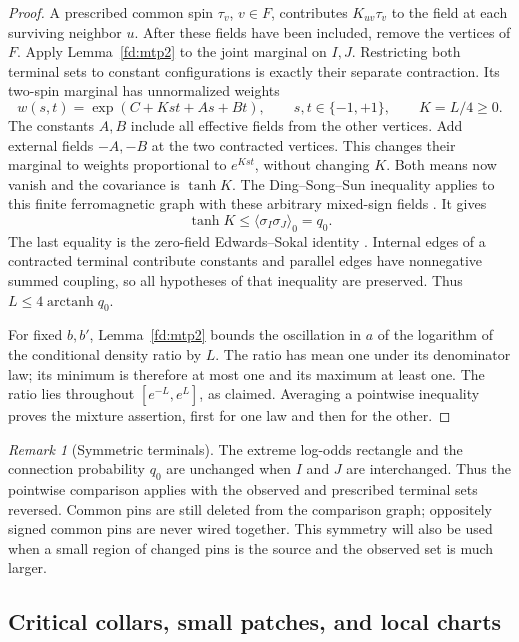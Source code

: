 \documentclass[11pt]{article}
\theoremstyle{definition}
\theoremstyle{remark}
\newtheorem{remark}[theorem]{Remark}
\numberwithin{equation}{section}
\begin{document}
\begin{proof}
A prescribed common spin $\tau_v$, $v\in F$, contributes
$K_{uv}\tau_v$ to the field at each surviving neighbor $u$.
After these fields have been included, remove the vertices of $F$.
Apply Lemma~\ref{fd:mtp2} to the joint marginal on \(I,J\).
Restricting both terminal sets to constant configurations is exactly their
separate contraction.  Its two-spin marginal has unnormalized weights
\[
 w(s,t)=\exp(C+Kst+As+Bt),\qquad s,t\in\{-1,+1\},
 \qquad K=L/4\ge0.
\]
The constants \(A,B\) include all effective fields from the other vertices.
Add external fields \(-A,-B\) at the two contracted vertices.  This changes
their marginal to weights proportional to \(e^{Kst}\), without changing
\(K\).  Both means now vanish and the covariance is \(\tanh K\).
The Ding--Song--Sun inequality applies to this finite ferromagnetic graph
with these arbitrary mixed-sign fields
\cite[Corollary~1.3]{DSS2023}.  It gives
\[
 \tanh K\le\langle\sigma_I\sigma_J\rangle_0=q_0.
\]
The last equality is the zero-field Edwards--Sokal identity
\cite{EdwardsSokal1988}.
Internal edges of a contracted terminal contribute constants and parallel
edges have nonnegative summed coupling, so all hypotheses of that
inequality are preserved.  Thus \(L\le4\operatorname{arctanh}q_0\).

For fixed \(b,b'\), Lemma~\ref{fd:mtp2} bounds the oscillation in \(a\)
of the logarithm of the conditional density ratio by \(L\).
The ratio has mean one under its denominator law; its minimum is therefore
at most one and its maximum at least one.  The ratio lies throughout
\([e^{-L},e^L]\), as claimed.  Averaging a pointwise inequality proves the
mixture assertion, first for one law and then for the other.
\end{proof}

\begin{remark}[Symmetric terminals]\label{fd:symmetric-terminals}
The extreme log-odds rectangle and the connection probability $q_0$
are unchanged when $I$ and $J$ are interchanged. Thus the pointwise
comparison applies with the observed and prescribed terminal sets
reversed. Common pins are still deleted from the comparison graph;
oppositely signed common pins are never wired together. This symmetry
will also be used when a small region of changed pins is the source
and the observed set is much larger.
\end{remark}

\subsection{Critical collars, small patches, and local charts}
\end{document}
